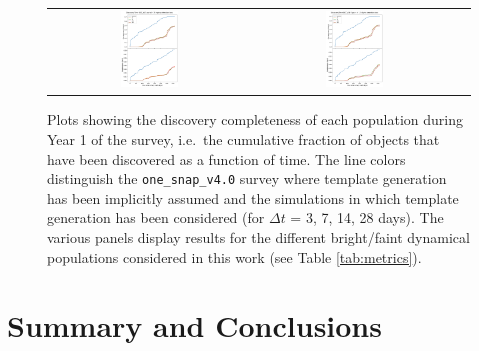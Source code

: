 \documentclass[preprintm,linenumbers]{aastex631}
\newcommand{\baseline}{\texttt{one\_snap\_v4.0}\xspace}
\begin{document}
\begin{figure}
\begin{tabular}{c c c}
				\includegraphics[width=0.3\textwidth]{results/DiscoveryTime_OCC_r5_first_year_one_snap_v4_0_10yrs_db_n_visits_4_noDD_noTwi.pdf} &
				\includegraphics[width=0.3\textwidth]{results/DiscoveryTime_OCC_r20_first_year_one_snap_v4_0_10yrs_db_n_visits_4_noDD_noTwi.pdf} \\
			\end{tabular}
			\caption{Plots showing the discovery completeness of each population during Year 1 of the survey, i.e.\ the cumulative fraction of objects that have been discovered as a function of time.
				The line colors distinguish the \baseline survey where template generation has been implicitly assumed and the simulations in which template generation has been considered (for $\Delta t$ = 3, 7, 14, 28 days).
				The various panels display results for the different bright/faint dynamical populations considered in this work (see Table \ref{tab:metrics}).
			}
			\label{fig:completeness_over_time}
		\end{figure}
		
		\section{Summary and Conclusions}
		\label{sec:summary_conclusions}
		
\end{document}
